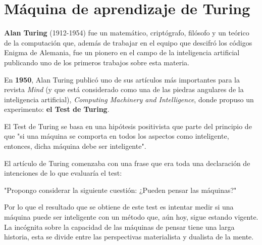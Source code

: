 \documentclass[a4paper, 11pt]{article} %
\begin{document}
\section{Máquina de aprendizaje de Turing}
\textbf{Alan Turing} (1912-1954) fue un matemático, criptógrafo, filósofo y un teórico de la computación que, además de trabajar en el equipo que descifró los códigos Enigma de Alemania, fue un pionero en el campo de la inteligencia artificial publicando uno de los primeros trabajos sobre esta materia.

En \textbf{1950}, Alan Turing publicó uno de sus artículos más importantes para la revista \textit{Mind} (y que está considerado como una de las piedras angulares de la inteligencia artificial), \textit{Computing Machinery and Intelligence}, donde propuso un experimento: \textbf{el Test de Turing}.

El Test de Turing se basa en una hipótesis positivista que parte del principio de que "si una máquina se comporta en todos los aspectos como inteligente, entonces, dicha máquina debe ser inteligente".

El artículo de Turing comenzaba con una frase que era toda una declaración de intenciones de lo que evaluaría el test:
\begin{shaded}
"Propongo considerar la siguiente cuestión: ¿Pueden pensar las máquinas?"
\end{shaded}

Por lo que el resultado que se obtiene de este test es intentar medir si una máquina puede ser inteligente con un método que, aún hoy, sigue estando vigente.\\

La incógnita sobre la capacidad de las máquinas de pensar tiene una larga historia, esta se divide entre las perspectivas materialista y dualista de la mente.
\end{document}
